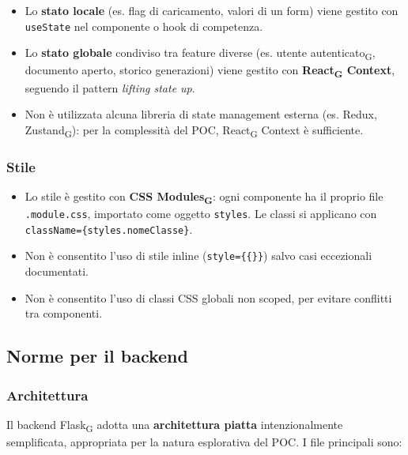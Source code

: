 \documentclass[11pt,a4paper]{article}
\newcommand{\gls}[1]{#1\textsubscript{G}}
\begin{document}
\begin{itemize}
    \item Lo \textbf{stato locale} (es. flag di caricamento, valori di un form) viene gestito con \texttt{useState} nel componente o hook di competenza.
    \item Lo \textbf{stato globale} condiviso tra feature diverse (es. \gls{utente autenticato}, documento aperto, storico generazioni) viene gestito con \textbf{\gls{React} Context}, seguendo il pattern \textit{lifting state up}.
    \item Non è utilizzata alcuna libreria di state management esterna (es. Redux, \gls{Zustand}): per la complessità del POC, \gls{React} Context è sufficiente.
\end{itemize}
 
\subsubsection{Stile}
 
\begin{itemize}
    \item Lo stile è gestito con \textbf{\gls{CSS Modules}}: ogni componente ha il proprio file \texttt{.module.css}, importato come oggetto \texttt{styles}. Le classi si applicano con \texttt{className=\{styles.nomeClasse\}}.
    \item Non è consentito l'uso di stile inline (\texttt{style=\{\{\}\}}) salvo casi eccezionali documentati.
    \item Non è consentito l'uso di classi CSS globali non scoped, per evitare conflitti tra componenti.
\end{itemize}
 
\subsection{Norme per il backend}
 
\subsubsection{Architettura}
 
Il backend \gls{Flask} adotta una \textbf{architettura piatta} intenzionalmente semplificata, appropriata per la natura esplorativa del POC. I file principali sono:
 
\end{document}
